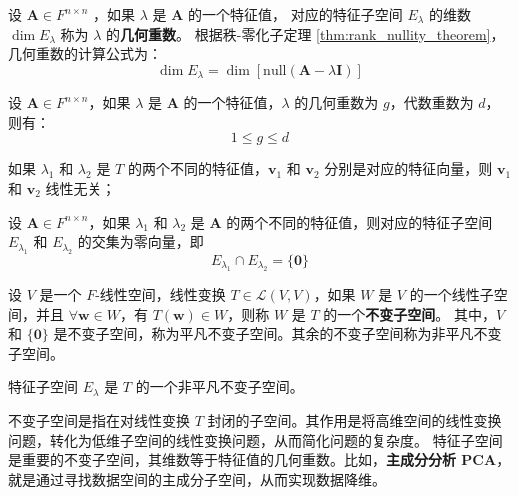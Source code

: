 \begin{definition}
    设 $\mathbf{A}\in F^{n\times n}$ ，如果 $\lambda$ 是 $\mathbf{A}$ 的一个特征值，
    对应的特征子空间 $E_\lambda$ 的维数 $\dim E_\lambda$ 称为 $\lambda$ 的\textbf{几何重数}。
    根据秩-零化子定理 \ref{thm:rank_nullity_theorem}，几何重数的计算公式为：
    \[
        \dim E_\lambda = \dim[\mathrm{null}(\mathbf{A} - \lambda \mathbf{I})]
    \]
    \label{def:geometric_multiplicity_of_eigenvalue}
\end{definition}

\begin{proposition}[几何重数与代数重数的关系]
    设 $\mathbf{A}\in F^{n\times n}$，如果 $\lambda$ 是 $\mathbf{A}$ 的一个特征值，$\lambda$ 的几何重数为 $g$，代数重数为 $d$，则有：
    \[
        1 \leq g \leq d
    \]
\end{proposition}
\vspace{1em}

\begin{proposition}[不同特征值对应的特征向量线性无关]
    如果 $\lambda_1$ 和 $\lambda_2$ 是 $T$ 的两个不同的特征值，$\mathbf{v}_1$ 和 $\mathbf{v}_2$ 分别是对应的特征向量，则 $\mathbf{v}_1$ 和 $\mathbf{v}_2$ 线性无关；
\end{proposition}

\begin{corollary}[不同特征值的特征子空间的交集为零向量]
    设 $\mathbf{A}\in F^{n\times n}$，如果 $\lambda_1$ 和 $\lambda_2$ 是 $\mathbf{A}$ 的两个不同的特征值，则对应的特征子空间 $E_{\lambda_1}$ 和 $E_{\lambda_2}$ 的交集为零向量，即
    \[
        E_{\lambda_1} \cap E_{\lambda_2} = \{\mathbf{0}\}
    \]
\end{corollary}
\vspace{1em}

\begin{definition}
    设 $V$ 是一个 $F$-线性空间，线性变换 $T\in \mathcal{L}(V,V)$，如果 $W$ 是 $V$ 的一个线性子空间，并且 $\forall \mathbf{w}\in W$，有 $T(\mathbf{w})\in W$，则称 $W$ 是 $T$ 的一个\textbf{不变子空间}。
    其中，$V$ 和 $\{\mathbf{0}\}$ 是不变子空间，称为平凡不变子空间。其余的不变子空间称为非平凡不变子空间。
    \label{def:invariant_subspace}
\end{definition}

\begin{proposition}
    特征子空间 $E_\lambda$ 是 $T$ 的一个非平凡不变子空间。
\end{proposition}

\begin{note}
    不变子空间是指在对线性变换 $T$ 封闭的子空间。其作用是将高维空间的线性变换问题，转化为低维子空间的线性变换问题，从而简化问题的复杂度。
    特征子空间是重要的不变子空间，其维数等于特征值的几何重数。比如，\textbf{主成分分析 PCA}，就是通过寻找数据空间的主成分子空间，从而实现数据降维。
\end{note}



\newpage